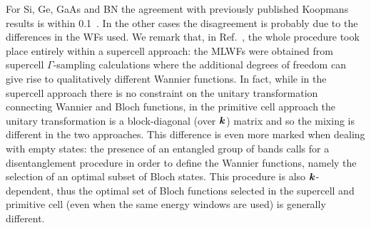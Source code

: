 For Si, Ge, GaAs and BN the agreement with previously published Koopmans results \cite{nguyen_koopmans-compliant_2018} is within 0.1~\ev. In the other cases the disagreement is probably due to the differences in the WFs used. We remark that, in Ref.~\cite{nguyen_koopmans-compliant_2018}, the whole procedure took place entirely within a supercell approach: the MLWFs were obtained from supercell $\Gamma$-sampling calculations where the additional degrees of freedom can give rise to qualitatively different Wannier functions. In fact, while in the supercell approach there is no constraint on the unitary transformation connecting Wannier and Bloch functions, in the primitive cell approach the unitary transformation is a block-diagonal (over ${\bm k}$) matrix and so the mixing is different in the two approaches. This difference is even more marked when dealing with empty states: the presence of an entangled group of bands calls for a disentanglement procedure in order to define the Wannier functions, namely the selection of an optimal subset of Bloch states. This procedure is also ${\bm k}$-dependent, thus the optimal set of Bloch functions selected in the supercell and primitive cell (even when the same energy windows are used) is generally different.

